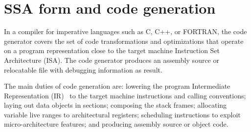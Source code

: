 \chapter{SSA form and code generation }
\label{chapter:machine_dependent_optimization_codegen}

In a compiler for imperative languages such as C, C++, or FORTRAN, the code
generator covers the set of code transformations and optimizations that operate
on a program representation close to the target machine Instruction Set
Architecture (ISA). The code generator produces an
assembly source or relocatable file with debugging information as result.

The main duties of code generation are: lowering the program Intermediate
Representation (IR)~\cite{Stanier:2013:CS} to the target machine instructions and calling conventions;
laying out data objects in sections; composing the stack frames; allocating
variable live ranges to architectural registers; scheduling instructions to
exploit micro-architecture features; and producing assembly source or object code.

